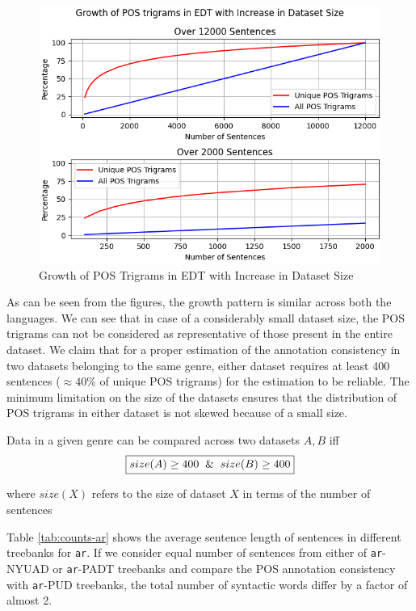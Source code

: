 \begin{figure}[H]
    \centering
    \includegraphics[scale=0.75]{img/trigram-stats-EDT.png}
    \caption{Growth of POS Trigrams in EDT with Increase in Dataset Size}
    \label{fig:trigram-EDT}
\end{figure}

As can be seen from the figures, the growth pattern is similar across both the languages. We can see that in case of a considerably small dataset size, the POS trigrams can not be considered as representative of those present in the entire dataset. We claim that for a proper estimation of the annotation consistency in two datasets belonging to the same genre, either dataset requires at least 400 sentences ($\approx 40\%$ of unique POS trigrams) for the estimation to be reliable. The minimum limitation on the size of the datasets ensures that the distribution of POS trigrams in either dataset is not skewed because of a small size.

\begin{claim}
Data in a given genre can be compared across two datasets $A, B$ iff \\
\begin{equation*}
    \boxed{size(A) \geq 400 \And size(B) \geq 400}
\end{equation*}
\label{claim:pos_size_init}
\end{claim}

where $size(X)$ refers to the size of dataset $X$ in terms of the number of sentences

Table \ref{tab:counts-ar} shows the average sentence length of sentences in different treebanks for \verb|ar|. If we consider equal number of sentences from either of \verb|ar|-NYUAD or \verb|ar|-PADT treebanks and compare the POS annotation consistency with \verb|ar|-PUD treebanks, the total number of syntactic words differ by a factor of almost 2. 

